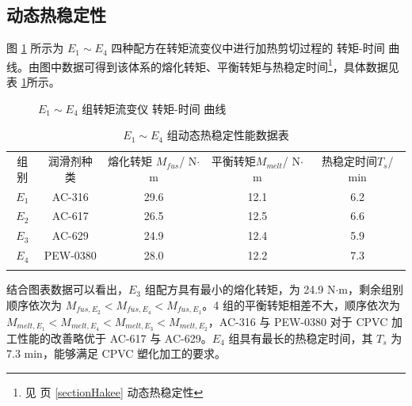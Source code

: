 \subsection{动态热稳定性}

图 \ref{fig1Hakee} 所示为 $E_1 \sim E_4$ 四种配方在转矩流变仪中进行加热剪切过程的 转矩-时间 曲线。由图中数据可得到该体系的熔化转矩、平衡转矩与热稳定时间\footnote{见 \pageref{sectionHakee} 页 \ref{sectionHakee} 动态热稳定性}，具体数据见表 \ref{tab1Hakee}所示。

\begin{figure}[!htb]
    \begin{center}
        
    \end{center}
    \caption{$E_1 \sim E_4$ 组转矩流变仪 转矩-时间 曲线}
    \label{fig1Hakee}
\end{figure}

\begin{table}[!htb]
    \caption{$E_1 \sim E_4$ 组动态热稳定性能数据表}
    \label{tab1Hakee}
    \begin{center}
    \footnotesize{
        \begin{tabular}{ccccc}
            \Xhline{1pt}
            组别 & 润滑剂种类 & \makecell[c]{熔化转矩 $M_{fus}$/\\N$\cdot$m} & \makecell[c]{平衡转矩$M_{melt}$/\\N$\cdot$m} & \makecell[c]{热稳定时间$T_{s}$/\\min} \\
            \Xhline{0.5pt}
            $E_1$ & AC-316 & 29.6 & 12.1 & 6.2  \\
            $E_2$ & AC-617 & 26.5 & 12.5 & 6.6  \\
            $E_3$ & AC-629 & 24.9 & 12.4 & 5.9  \\
            $E_4$ & PEW-0380 & 28.0 & 12.2 & 7.3    \\
            \Xhline{1pt}
        \end{tabular}
    }
    \end{center}
\end{table}

结合图表数据可以看出，$E_3$ 组配方具有最小的熔化转矩，为 24.9 N$\cdot$m，剩余组别顺序依次为 $M_{fus, E_2} < M_{fus, E_4} < M_{fus, E_1}$。4 组的平衡转矩相差不大，顺序依次为 $M_{melt, E_1} < M_{melt, E_4} < M_{melt, E_3} < M_{melt, E_2}$，AC-316 与 PEW-0380 对于 CPVC 加工性能的改善略优于 AC-617 与 AC-629。$E_4$ 组具有最长的热稳定时间，其 $T_{s}$ 为 7.3 min，能够满足 CPVC 塑化加工的要求。

